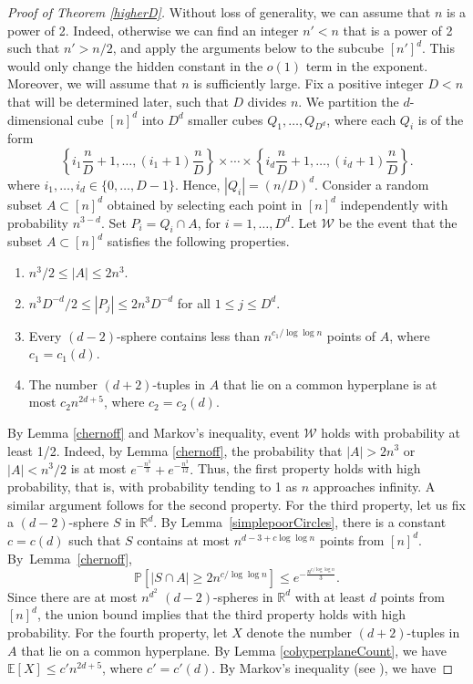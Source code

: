 \begin{proof}[Proof of Theorem \ref{higherD}]
    Without loss of generality, we can assume that $n$ is a power of 2.  Indeed, otherwise we can find an integer $n' < n$ that is a power of 2 such that $n' > n/2$, and apply the arguments below to the subcube $[n']^d$.  This would only change the hidden constant in the $o(1)$ term in the exponent.  Moreover, we will assume that $n$ is sufficiently large.
%
Fix a positive integer $D < n$ that will be determined later, such that $D$ divides $n$. We partition the $d$-dimensional cube $[n]^d$ into $D^d$ smaller cubes $Q_1,\ldots, Q_{D^d}$, where each $Q_i$ is of the form
%
%
    $$\left\{i_1 \frac{n}{D}  + 1,\ldots, (i_1 + 1) \frac{n}{D} \right\}\times \cdots \times \left\{i_d\frac{n}{D} + 1,\ldots, (i_d + 1) \frac{n}{D} \right\}.$$
%
\noindent where $i_1,\ldots, i_d \in \{0,\ldots, D-1\}$. Hence, $|Q_i| = (n/D)^d$. 
%
%
%
%
Consider a random subset $A\subset [n]^d$ obtained by selecting each point in $[n]^d$ independently with probability $n^{3-d}$.   Set $P_i = Q_i\cap A$, for $i = 1,\ldots, D^d$. Let $\mathcal{W}$ be the event that the subset $A\subset [n]^d$ satisfies the following properties. 
%
%
\begin{enumerate}
    \item $n^3/2 \leq |A| \leq 2n^3$.
    \item $n^3D^{-d}/2 \leq |P_j| \leq 2n^3D^{-d}$ for all $1 \leq j \leq D^d$.
    \item Every $(d-2)$-sphere contains less than $n^{c_1/\log\log n}$ points of $A$, where $c_1 = c_1(d)$.
    \item The number $(d+2)$-tuples in $A$ that lie on a common hyperplane is at most $c_2n^{2d+5}$, where $c_2 = c_2(d)$.
\end{enumerate}
%
By Lemma \ref{chernoff} and Markov's inequality, event $\mathcal{W}$ holds with probability at least 1/2.   Indeed, by Lemma \ref{chernoff}, the probability that $|A| > 2n^3$ or $|A| < n^3/2$ is at most $e^{-\frac{n^3}{3}} + e^{-\frac{n^3}{12}}.$ Thus, the first property holds with high probability, that is, with probability tending to 1 as $n$ approaches infinity.  A similar argument follows for the second property.  For the third property, let us fix a $(d-2)$-sphere $S$ in $\mathbb{R}^d$.  By Lemma~\ref{simplepoorCircles}, there is a constant $c= c(d)$ such that $S$ contains at most $n^{d-3 + c\log\log n}$ points from $[n]^d$.  By~Lemma~\ref{chernoff}, 
%
$$\mathbb{P}[|S\cap A| \geq 2n^{c/\log\log n}] \leq  e^{-\frac{n^{c/\log\log n}}{3}}.$$
%
\noindent   Since there are at most $n^{d^2}$ $(d-2)$-spheres in $\mathbb{R}^d$ with at least $d$ points from $[n]^d$, the union bound implies that the third property holds with high probability.  For the fourth property, let $X$ denote the number $(d+2)$-tuples in $A$ that lie on a common hyperplane.  By Lemma \ref{cohyperplaneCount}, we have $\mathbb{E}[X] \leq c'n^{2d + 5}$, where $c' = c'(d)$. By Markov's inequality (see \cite{alon}), we have

\end{proof}
